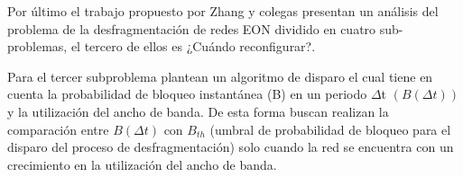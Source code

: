 Por último el trabajo propuesto por Zhang y colegas \cite{zhang2014dynamic} presentan un análisis del problema de la desfragmentación de redes EON dividido en cuatro sub-problemas, el tercero de ellos es ¿Cuándo reconfigurar?.

Para el tercer subproblema plantean un algoritmo de disparo el cual tiene en cuenta la probabilidad de bloqueo instantánea (B) en un periodo \(\Delta \)t \((B(\Delta t))\) y la utilización del ancho de banda. 
De esta forma buscan realizan la comparación entre \(B(\Delta t)\) con \(B_{th}\) (umbral de probabilidad de bloqueo para el disparo del proceso de desfragmentación) solo cuando la red se encuentra con un crecimiento en la utilización del ancho de banda. 
\newpage

